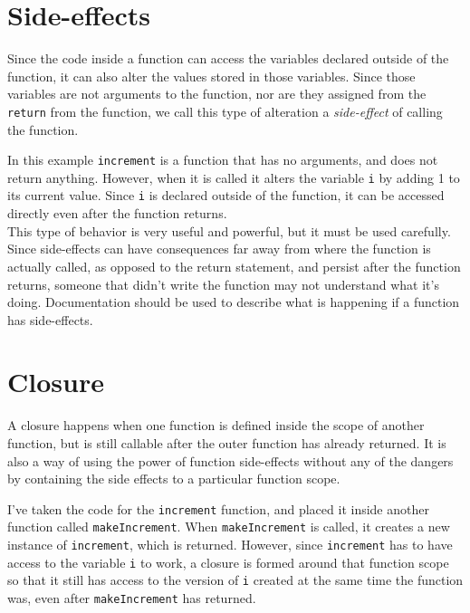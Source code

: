 

\section{Side-effects}


Since the code inside a function can access the variables declared outside of the function, it can also alter the values stored in those variables. Since those variables are not arguments to the function, nor are they assigned from the \texttt{return} from the function, we call this type of alteration a \textit{side-effect} of calling the function.


In this example \texttt{increment} is a function that has no arguments, and does not return anything. However, when it is called it alters the variable \texttt{i} by adding 1 to its current value. Since \texttt{i} is declared outside of the function, it can be accessed directly even after the function returns.\\

This type of behavior is very useful and powerful, but it must be used carefully. Since side-effects can have consequences far away from where the function is actually called, as opposed to the return statement, and persist after the function returns, someone that didn't write the function may not understand what it's doing. Documentation should be used to describe what is happening if a function has side-effects.\\

\section{Closure}


A closure happens when one function is defined inside the scope of another function, but is still callable after the outer function has already returned. It is also a way of using the power of function side-effects without any of the dangers by containing the side effects to a particular function scope.


I've taken the code for the \texttt{increment} function, and placed it inside another function called \texttt{makeIncrement}. When \texttt{makeIncrement} is called, it creates a new instance of \texttt{increment}, which is returned. However, since \texttt{increment} has to have access to the variable \texttt{i} to work, a closure is formed around that function scope so that it still has access to the version of \texttt{i} created at the same time the function was, even after \texttt{makeIncrement} has returned.\\

